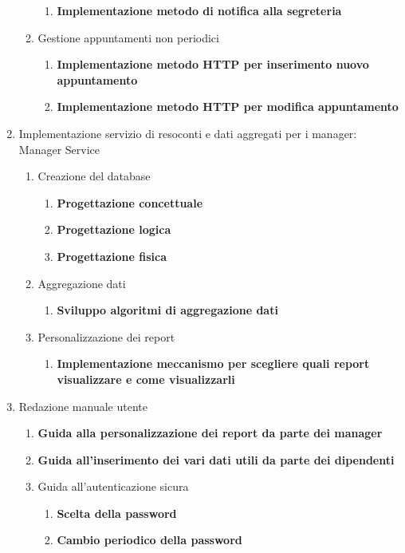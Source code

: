 \documentclass{article}
\begin{document}
\begin{enumerate}
\begin{enumerate}
\begin{enumerate}
                \item \textbf{Implementazione metodo di notifica alla segreteria}
            \end{enumerate}
            \item Gestione appuntamenti non periodici
            \begin{enumerate}
                \item \textbf{Implementazione metodo HTTP per inserimento nuovo appuntamento}
                \item \textbf{Implementazione metodo HTTP per modifica appuntamento}
            \end{enumerate}
        \end{enumerate}
        \item Implementazione servizio di resoconti e dati aggregati per i manager: Manager Service
        \begin{enumerate}
            \item Creazione del database
            \begin{enumerate}
                \item \textbf{Progettazione concettuale}
                \item \textbf{Progettazione logica}
                \item \textbf{Progettazione fisica}
            \end{enumerate}
            \item Aggregazione dati
            \begin{enumerate}
                \item \textbf{Sviluppo algoritmi di aggregazione dati}
            \end{enumerate}
            \item Personalizzazione dei report
            \begin{enumerate}
                \item \textbf{Implementazione meccanismo per scegliere quali report visualizzare e come visualizzarli}
            \end{enumerate}
        \end{enumerate}
        \item Redazione manuale utente
        \begin{enumerate}
            \item \textbf{Guida alla personalizzazione dei report da parte dei manager}
            \item \textbf{Guida all'inserimento dei vari dati utili da parte dei dipendenti}
            \item Guida all'autenticazione sicura
            \begin{enumerate}
                \item \textbf{Scelta della password}
                \item \textbf{Cambio periodico della password}
            \end{enumerate}
        \end{enumerate}
    \end{enumerate}


 
\end{document}
